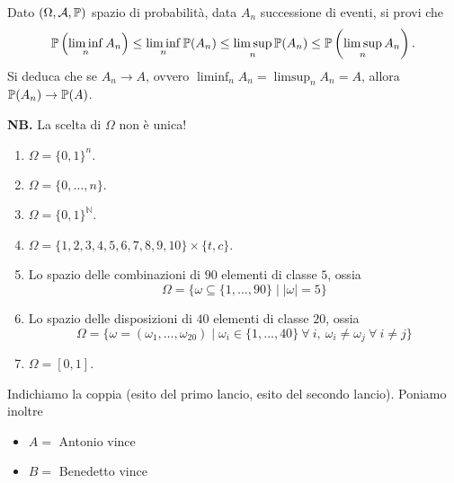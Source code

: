 Dato $( \Omega ,\mathcal{A} ,\mathbb{P})$ spazio di probabilità, data $A_{n}$ successione di eventi, si provi che
\begin{equation*}
\mathbb{P}\left(\liminf _{n} A_{n}\right) \leq \liminf _{n}\mathbb{P}( A_{n}) \leq \limsup _{n}\mathbb{P}( A_{n})\leq \mathbb{P}\left(\limsup _{n} A_{n}\right) .
\end{equation*}
Si deduca che se $A_{n}\rightarrow A$, ovvero $\liminf_{n} A_{n} =\limsup _{n} A_{n} =A$, allora $\mathbb{P}( A_{n})\rightarrow \mathbb{P}( A)$.



\ParteSoluzioni










\Soluzione

\textbf{NB.} La scelta di $\Omega $ non è unica!
\begin{enumerate}
\item $\Omega =\{0,1\}^{n} .$
\item $\Omega =\{0,\dots ,n\}$.
\item $\Omega =\{0,1\}^{\mathbb{N}}$.
\item $\Omega =\{1,2,3,4,5,6,7,8,9,10\} \times \{t,c\}$.
\item Lo spazio delle combinazioni di $90$ elementi di classe $5$, ossia\begin{equation*}
\Omega =\{\omega \subseteq \{1,\dots ,90\} \mid |\omega |=5\}
\end{equation*}
\item Lo spazio delle disposizioni di $40$ elementi di classe $20$, ossia\begin{equation*}
\Omega =\{\omega =( \omega _{1} ,\dots ,\omega _{20}) \mid \omega _{i} \in \{1,\dots ,40\} \ \forall \ i,\ \omega _{i} \neq \omega _{j} \ \forall \ i\neq j\}
\end{equation*}
\item $\Omega =[ 0,1]$.
\end{enumerate}
\Soluzione

Indichiamo la coppia (esito del primo lancio, esito del secondo lancio). Poniamo inoltre
\begin{itemize}
\item $A=$ Antonio vince
\item $B=$ Benedetto vince
\end{itemize}


